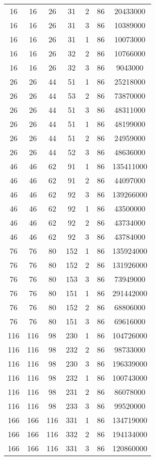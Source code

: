 \documentclass[a4paper,11pt]{article}
\begin{document}
\begin{longtable}{ |c|c|c|c|c|c|c| }
16 & 16 & 26 & 31 & 2 & 86 & 20433000 \\
16 & 16 & 26 & 31 & 3 & 86 & 10389000 \\
16 & 16 & 26 & 31 & 1 & 86 & 10073000 \\
16 & 16 & 26 & 32 & 2 & 86 & 10766000 \\
16 & 16 & 26 & 32 & 3 & 86 & 9043000 \\
26 & 26 & 44 & 51 & 1 & 86 & 25218000 \\
26 & 26 & 44 & 53 & 2 & 86 & 73870000 \\
26 & 26 & 44 & 51 & 3 & 86 & 48311000 \\
26 & 26 & 44 & 51 & 1 & 86 & 48199000 \\
26 & 26 & 44 & 51 & 2 & 86 & 24959000 \\
26 & 26 & 44 & 52 & 3 & 86 & 48636000 \\
46 & 46 & 62 & 91 & 1 & 86 & 135411000 \\
46 & 46 & 62 & 91 & 2 & 86 & 44097000 \\
46 & 46 & 62 & 92 & 3 & 86 & 139266000 \\
46 & 46 & 62 & 92 & 1 & 86 & 43500000 \\
46 & 46 & 62 & 92 & 2 & 86 & 43734000 \\
46 & 46 & 62 & 92 & 3 & 86 & 43784000 \\
76 & 76 & 80 & 152 & 1 & 86 & 135924000 \\
76 & 76 & 80 & 152 & 2 & 86 & 131926000 \\
76 & 76 & 80 & 153 & 3 & 86 & 73949000 \\
76 & 76 & 80 & 151 & 1 & 86 & 291442000 \\
76 & 76 & 80 & 152 & 2 & 86 & 68806000 \\
76 & 76 & 80 & 151 & 3 & 86 & 69616000 \\
116 & 116 & 98 & 230 & 1 & 86 & 104726000 \\
116 & 116 & 98 & 232 & 2 & 86 & 98733000 \\
116 & 116 & 98 & 230 & 3 & 86 & 196339000 \\
116 & 116 & 98 & 232 & 1 & 86 & 100743000 \\
116 & 116 & 98 & 231 & 2 & 86 & 86078000 \\
116 & 116 & 98 & 233 & 3 & 86 & 99520000 \\
166 & 166 & 116 & 331 & 1 & 86 & 134719000 \\
166 & 166 & 116 & 332 & 2 & 86 & 194134000 \\
166 & 166 & 116 & 331 & 3 & 86 & 120860000 \\

\end{longtable}
\end{document}
